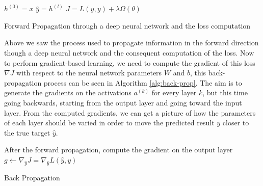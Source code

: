 \documentclass[14pt]{extarticle}
\numberwithin{equation}{section}
\begin{document}
\\\\
	\begin{algorithm}[H]
		\DontPrintSemicolon
		\SetAlgoLined
		\BlankLine
		$h^{(0)} = x$\;
		$\hat{y} = h^{(l)}$\;
		$J = L(\hat{y},y) + \lambda	\Omega(\theta)$
		
		\caption{Forward Propagation through a deep neural network and the loss computation}\label{alg:forward-prop}
	\end{algorithm}

	Above we saw the process used to propagate information in the forward direction though a deep neural network and the consequent computation of the loss. Now to perform gradient-based learning, we need to compute the gradient of this loss $\nabla J$ with respect to the neural network parameters $W$ and $b$, this back-propagation process can be seen in Algorithm \ref{alg:back-prop}. The aim is to generate the gradients on the activations $a^{(k)}$ for every layer $k$, but this time going backwards, starting from the output layer and going toward the input layer. From the computed gradients, we can get a picture of how the parameters of each layer should be varied in order to move the predicted result $y$ closer to the true target $\hat{y}$.
	\begin{algorithm}[t]
		\DontPrintSemicolon
		\SetAlgoLined
		After the forward propagation, compute the gradient on the output layer\;
		$g \leftarrow \nabla_{\hat{y}}J = \nabla_{\hat{y}}L(\hat{y}, y)$\;
		\caption{Back Propagation}\label{alg:back-prop}
	\end{algorithm}
\end{document}
